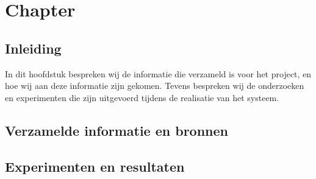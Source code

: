 \chapter{Chapter}
\section{Inleiding}
In dit hoofdstuk bespreken wij de informatie die verzameld is voor het project, en hoe wij aan deze informatie zijn gekomen.
Tevens bespreken wij de onderzoeken en experimenten die zijn uitgevoerd tijdens de realisatie van het systeem.
\newpage

\section{Verzamelde informatie en bronnen}


\section{Experimenten en resultaten}
